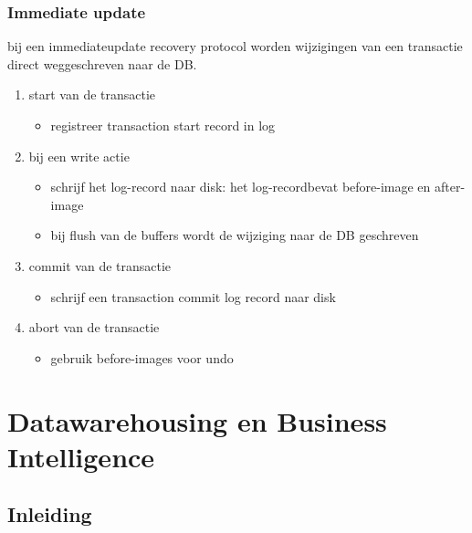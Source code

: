 \documentclass[a4paper,12pt]{article}
\begin{document}
\subsubsection{Immediate update}
bij een immediateupdate recovery protocol worden wijzigingen van een transactie direct weggeschreven naar de DB.
\begin{enumerate}
\item start van de transactie
	\begin{itemize}
	\item registreer transaction start record in log
	\end{itemize}
\item bij een write actie
	\begin{itemize}
	\item schrijf het log-record naar disk: het log-recordbevat before-image en after-image
	\item bij flush van de buffers wordt de wijziging naar de DB geschreven
	\end{itemize}
\item commit van de transactie
	\begin{itemize}
	\item schrijf een transaction commit log record naar disk
	\end{itemize}
\item abort van de transactie
	\begin{itemize}
	\item gebruik before-images voor undo
	\end{itemize}
\end{enumerate}

\section{Datawarehousing en Business Intelligence}
\subsection{Inleiding}
\end{document}
